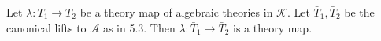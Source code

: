 Let $\lambda: T_1 \longrightarrow T_2$ be a theory map of algebraic theories in $\mathcal{K}$. Let $\bar{T}_1, \bar{T}_2$ be the canonical lifts to $\mathcal{A}$ as in 5.3. Then $\lambda: \bar{T}_1 \longrightarrow \bar{T}_2$ is a theory map.
